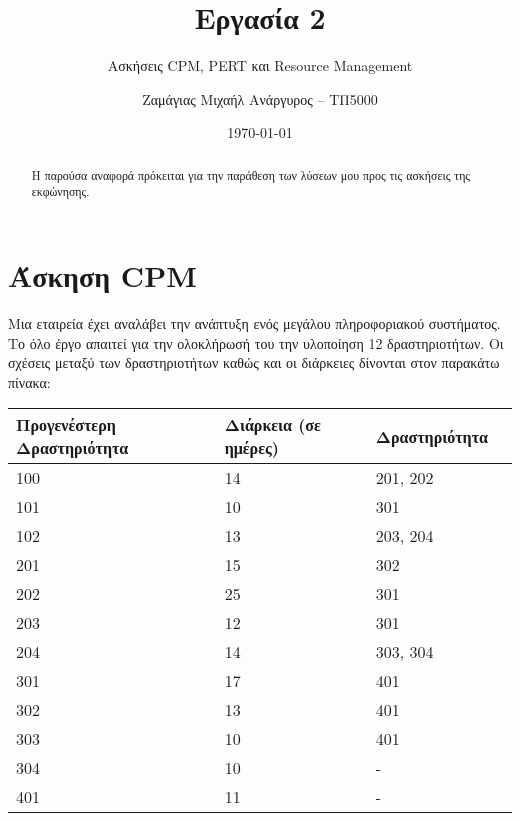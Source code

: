 \documentclass[12pt]{turabian-researchpaper}
\title{Εργασία 2}
\subtitle{Ασκήσεις CPM, PERT και Resource Management}
\author{Ζαμάγιας Μιχαήλ Ανάργυρος -- ΤΠ5000}
\date{\today}
\begin{document}
\begin{titlepage}
    \maketitle
\end{titlepage}

\begin{abstract}
    Η παρούσα αναφορά πρόκειται για την παράθεση των λύσεων μου προς τις ασκήσεις της εκφώνησης.
\end{abstract}

\tableofcontents

\newpage

\section{Άσκηση CPM}
Μια εταιρεία έχει αναλάβει την ανάπτυξη ενός μεγάλου πληροφοριακού συστήματος. Το όλο έργο απαιτεί για την ολοκλήρωσή του την υλοποίηση 12 δραστηριοτήτων. Οι σχέσεις μεταξύ των δραστηριοτήτων καθώς και οι διάρκειες δίνονται στον παρακάτω πίνακα:
\begin{table}
    \centering
    \begin{tabular}{llll}
        \hline
        Προγενέστερη Δραστηριότητα & Διάρκεια (σε ημέρες) & Δραστηριότητα \\ \hline
        100                        & 14                   & 201, 202      \\
        101                        & 10                   & 301           \\
        102                        & 13                   & 203, 204      \\
        201                        & 15                   & 302           \\
        202                        & 25                   & 301           \\
        203                        & 12                   & 301           \\
        204                        & 14                   & 303, 304      \\
        301                        & 17                   & 401           \\
        302                        & 13                   & 401           \\
        303                        & 10                   & 401           \\
        304                        & 10                   & -             \\
        401                        & 11                   & -             \\ \hline
    \end{tabular}
\end{table}
\end{document}
